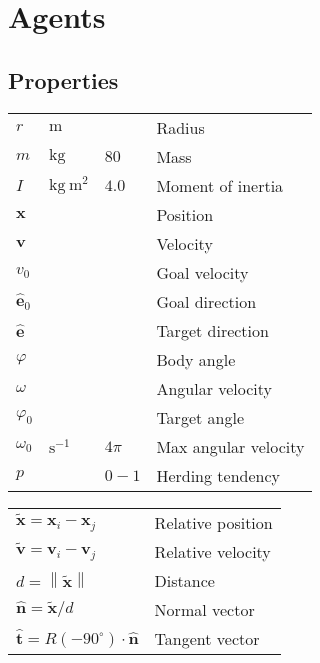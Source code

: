 \section{Agents}
\subsection{Properties}
\begin{table}[H]
\centering
\begin{tabular}{llll}
\hline
\hline
$ r $                    & $ \mathrm{m} $ &  & Radius \\
$ m $                    & $ \mathrm{kg} $ & $ 80 $ & Mass \\
$ I $                    & $ \mathrm{kg \ m^{2}} $ & $ 4.0 $ & Moment of inertia \\
\hline
\hline
$ \mathbf{x} $           &  &  & Position \\
$ \mathbf{v} $           &  &  & Velocity \\
$ v_{0} $                &  &  & Goal velocity \\  
$ \hat{\mathbf{e}}_{0} $ &  &  & Goal direction \\
$ \hat{\mathbf{e}} $     &  &  & Target direction \\
\hline
\hline
$ \varphi $              &  &  & Body angle \\
$ \omega $               &  &  & Angular velocity \\
$ \varphi_{0} $          &  &  & Target angle \\
$ \omega_{0} $           & $ \mathrm{s^{-1}} $ & $ 4\pi $ & Max angular velocity \\
\hline
\hline
$ p $                    &  & $ 0 - 1 $ & Herding tendency \\
\end{tabular}
\end{table}

\begin{table}[H]
\centering
\begin{tabular}{ll}
$ \tilde{\mathbf{x}} = \mathbf{x}_{i} - \mathbf{x}_{j} $ & Relative position \\
$ \tilde{\mathbf{v}} = \mathbf{v}_{i} - \mathbf{v}_{j} $ & Relative velocity \\
$ d = \left\|\tilde{\mathbf{x}}\right\| $ & Distance\\
$ \hat{\mathbf{n}} = \tilde{\mathbf{x}} / d $ & Normal vector \\
$ \hat{\mathbf{t}} = R(-90^{\circ}) \cdot \hat{\mathbf{n}} $ & Tangent vector \\
\end{tabular}
\end{table}

